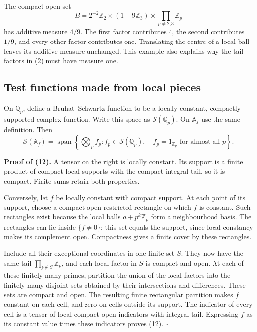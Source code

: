 \documentclass[
  english,
  11pt,
  a4paper,
]{article}
\begin{document}
The compact open set \[B=2^{-2}\mathbb Z_2\times(1+9\mathbb Z_3)
\times\prod_{p\neq2,3}\mathbb Z_p\] has additive measure \(4/9\). The
first factor contributes \(4\), the second contributes \(1/9\), and
every other factor contributes one. Translating the centre of a local
ball leaves its additive measure unchanged. This example also explains
why the tail factors in (2) must have measure one.

\subsection{Test functions made from local
pieces}\label{NT-ADL-01--test-functions-made-from-local-pieces}

On \(\mathbb Q_p\), define a Bruhat--Schwartz function to be a locally
constant, compactly supported complex function. Write this space as
\(\mathcal S(\mathbb Q_p)\). On \(\mathbb A_f\) use the same definition.
Then \[\mathcal S(\mathbb A_f)
=\operatorname{span}\left\{\bigotimes_p f_p:
f_p\in\mathcal S(\mathbb Q_p),\quad
f_p=1_{\mathbb Z_p}\text{ for almost all }p\right\}.
\tag{12}\]

\textbf{Proof of (12).} A tensor on the right is locally constant. Its
support is a finite product of compact local supports with the compact
integral tail, so it is compact. Finite sums retain both properties.

Conversely, let \(f\) be locally constant with compact support. At each
point of its support, choose a compact open restricted rectangle on
which \(f\) is constant. Such rectangles exist because the local balls
\(a+p^k\mathbb Z_p\) form a neighbourhood basis. The rectangles can lie
inside \(\{f\neq0\}\): this set equals the support, since local
constancy makes its complement open. Compactness gives a finite cover by
these rectangles.

Include all their exceptional coordinates in one finite set \(S\). They
now have the same tail \(\prod_{p\notin S}\mathbb Z_p\), and each local
factor in \(S\) is compact and open. At each of these finitely many
primes, partition the union of the local factors into the finitely many
disjoint sets obtained by their intersections and differences. These
sets are compact and open. The resulting finite rectangular partition
makes \(f\) constant on each cell, and zero on cells outside its
support. The indicator of every cell is a tensor of local compact open
indicators with integral tail. Expressing \(f\) as its constant value
times these indicators proves (12). \(\square\)
\end{document}

